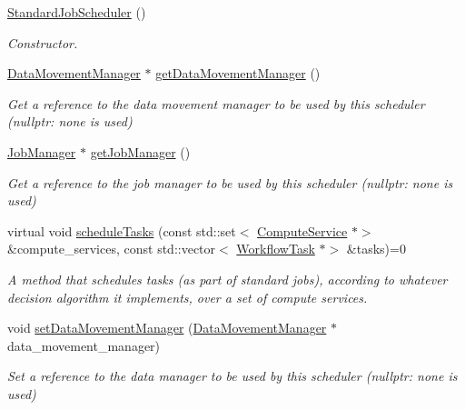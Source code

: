 \begin{DoxyCompactItemize}
\item 
\mbox{\label{classwrench_1_1_standard_job_scheduler_ac71c8f05963604731837d324061bde0b}} 
\hyperlink{classwrench_1_1_standard_job_scheduler_ac71c8f05963604731837d324061bde0b}{Standard\+Job\+Scheduler} ()
\begin{DoxyCompactList}\small\item\em Constructor. \end{DoxyCompactList}\item 
\hyperlink{classwrench_1_1_data_movement_manager}{Data\+Movement\+Manager} $\ast$ \hyperlink{classwrench_1_1_standard_job_scheduler_af570fb0bd50992704a8546d33e644a22}{get\+Data\+Movement\+Manager} ()
\begin{DoxyCompactList}\small\item\em Get a reference to the data movement manager to be used by this scheduler (nullptr\+: none is used) \end{DoxyCompactList}\item 
\hyperlink{classwrench_1_1_job_manager}{Job\+Manager} $\ast$ \hyperlink{classwrench_1_1_standard_job_scheduler_a95d72ffb0b6609899bdca37b230c5f8b}{get\+Job\+Manager} ()
\begin{DoxyCompactList}\small\item\em Get a reference to the job manager to be used by this scheduler (nullptr\+: none is used) \end{DoxyCompactList}\item 
virtual void \hyperlink{classwrench_1_1_standard_job_scheduler_a1ef07acfece4706f7f172c740a8015c3}{schedule\+Tasks} (const std\+::set$<$ \hyperlink{classwrench_1_1_compute_service}{Compute\+Service} $\ast$$>$ \&compute\+\_\+services, const std\+::vector$<$ \hyperlink{classwrench_1_1_workflow_task}{Workflow\+Task} $\ast$$>$ \&tasks)=0
\begin{DoxyCompactList}\small\item\em A method that schedules tasks (as part of standard jobs), according to whatever decision algorithm it implements, over a set of compute services. \end{DoxyCompactList}\item 
void \hyperlink{classwrench_1_1_standard_job_scheduler_a339858962279af4563461f872b4ea7d4}{set\+Data\+Movement\+Manager} (\hyperlink{classwrench_1_1_data_movement_manager}{Data\+Movement\+Manager} $\ast$data\+\_\+movement\+\_\+manager)
\begin{DoxyCompactList}\small\item\em Set a reference to the data manager to be used by this scheduler (nullptr\+: none is used) \end{DoxyCompactList}\item 

\end{DoxyCompactItemize}

